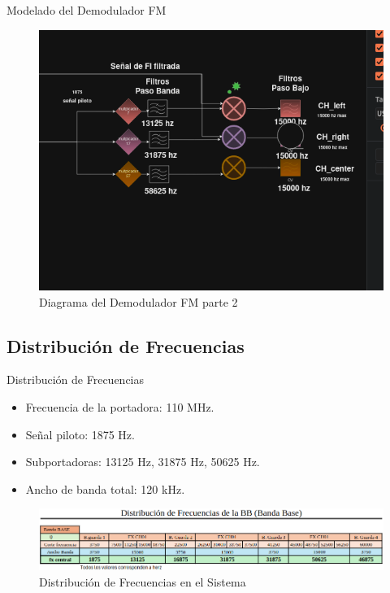 \documentclass[mathserif,spanish]{beamer}
\begin{document}
\begin{frame}{Modelado del Demodulador FM}
   
    \begin{figure}[h]
        \centering
        \includegraphics[scale=0.3]{demo_01.png}
        \caption{Diagrama del Demodulador FM parte 2}
    \end{figure}
\end{frame}









\subsection{Distribución de Frecuencias}
\begin{frame}{Distribución de Frecuencias}
    \begin{itemize}
        \item Frecuencia de la portadora: 110 MHz.
        \item Señal piloto: 1875 Hz.
        \item Subportadoras: 13125 Hz, 31875 Hz, 50625 Hz.
        \item Ancho de banda total: 120 kHz.
    \end{itemize}
    \begin{figure}[h]
        \centering
        \includegraphics[width=\textwidth]{fx_BB.png}
        \caption{Distribución de Frecuencias en el Sistema}
    \end{figure}
\end{frame}
\end{document}
